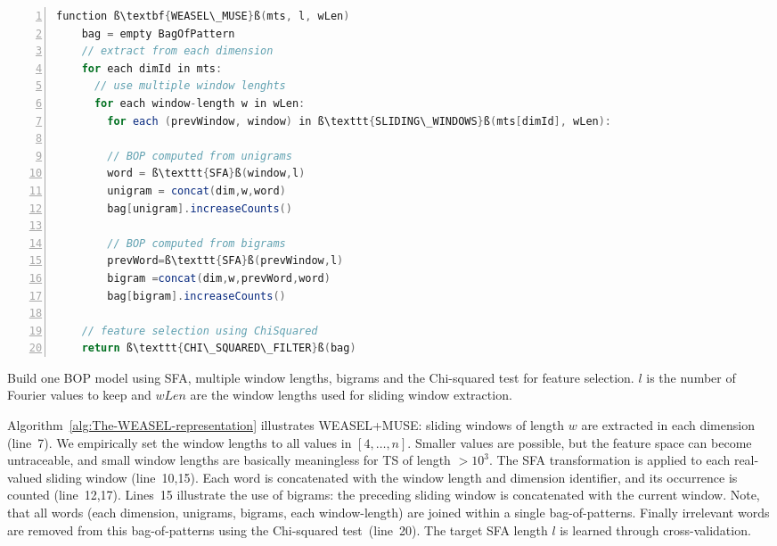 \documentclass[sigconf]{acmart}
\begin{document}
\begin{algorithm}[t]
	\begin{lstlisting}[language=Java,numbers=left,basicstyle={\sffamily},breaklines=true,showstringspaces=false,tabsize=2,numbersep=1em,xleftmargin=2em,xrightmargin=0em,emph={function, in, all, each, to},emphstyle={\textbf},escapechar={ß}]
function ß\textbf{WEASEL\_MUSE}ß(mts, l, wLen)
	bag = empty BagOfPattern
	// extract from each dimension
	for each dimId in mts:
	  // use multiple window lenghts
	  for each window-length w in wLen:
	    for each (prevWindow, window) in ß\texttt{SLIDING\_WINDOWS}ß(mts[dimId], wLen):
	
	    // BOP computed from unigrams
	    word = ß\texttt{SFA}ß(window,l)
	    unigram = concat(dim,w,word)
    	bag[unigram].increaseCounts()
	
	    // BOP computed from bigrams
    	prevWord=ß\texttt{SFA}ß(prevWindow,l)	
    	bigram =concat(dim,w,prevWord,word)
    	bag[bigram].increaseCounts()
    	
	// feature selection using ChiSquared
	return ß\texttt{CHI\_SQUARED\_FILTER}ß(bag)
	\end{lstlisting}
	
	\caption{Build one BOP model using SFA,
		multiple window lengths, bigrams and the Chi-squared test for feature
		selection. $l$ is the number of Fourier values to keep and $wLen$ are the window lengths used for sliding window extraction.\label{alg:The-WEASEL-representation}}
\end{algorithm}

Algorithm~\ref{alg:The-WEASEL-representation} illustrates WEASEL+MUSE: sliding windows of length $w$ are extracted in each dimension (line~7). We empirically set the window lengths to all values in $[4,\dots,n]$. Smaller values are possible, but the feature space can become untraceable, and small window lengths are basically meaningless for TS of length $>10^3$.
The SFA transformation is applied to each real-valued sliding window (line~10,15). Each word is concatenated with the window length and dimension identifier, and its occurrence is counted (line~12,17). Lines~15 illustrate the use of bigrams: the preceding sliding window is concatenated with the current window. Note, that all words (each dimension, unigrams, bigrams, each window-length) are joined within a single bag-of-patterns. 
Finally irrelevant words are removed from this bag-of-patterns using the Chi-squared test~(line~20). The target SFA length $l$ is learned through cross-validation.
\end{document}

